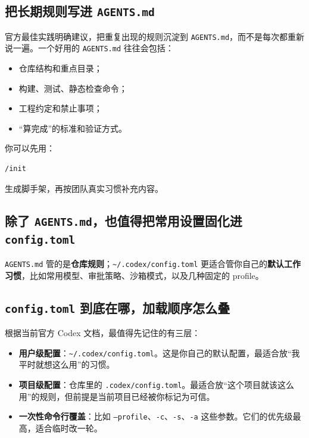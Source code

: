 \documentclass[UTF8,a4paper,12pt]{ctexart}
\begin{document}
\subsection{把长期规则写进 \texttt{AGENTS.md}}

官方最佳实践明确建议，把重复出现的规则沉淀到 \texttt{AGENTS.md}，而不是每次都重新说一遍。一个好用的 \texttt{AGENTS.md} 往往会包括：
\begin{itemize}
  \item 仓库结构和重点目录；
  \item 构建、测试、静态检查命令；
  \item 工程约定和禁止事项；
  \item “算完成”的标准和验证方式。
\end{itemize}

你可以先用：

\begin{lstlisting}[style=cli]
/init
\end{lstlisting}

生成脚手架，再按团队真实习惯补充内容。

\subsection{除了 \texttt{AGENTS.md}，也值得把常用设置固化进 \texttt{config.toml}}

\texttt{AGENTS.md} 管的是\textbf{仓库规则}；\texttt{\textasciitilde/.codex/config.toml} 更适合管你自己的\textbf{默认工作习惯}，比如常用模型、审批策略、沙箱模式，以及几种固定的 profile。

\subsection{\texttt{config.toml} 到底在哪，加载顺序怎么叠}

根据当前官方 Codex 文档，最值得先记住的有三层：
\begin{itemize}
  \item \textbf{用户级配置}：\texttt{\textasciitilde/.codex/config.toml}。这是你自己的默认配置，最适合放“我平时就想这么用”的习惯。
  \item \textbf{项目级配置}：仓库里的 \texttt{.codex/config.toml}。最适合放“这个项目就该这么用”的规则，但前提是当前项目已经被你标记为可信。
  \item \textbf{一次性命令行覆盖}：比如 \texttt{--profile}、\texttt{-c}、\texttt{-s}、\texttt{-a} 这些参数。它们的优先级最高，适合临时改一轮。
\end{itemize}
\end{document}
